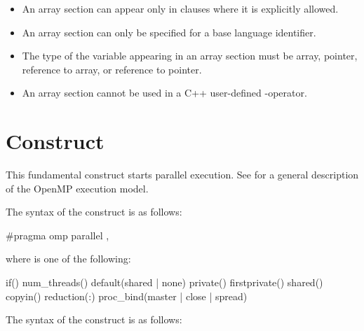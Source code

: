 \begin{itemize}
\item An array section can appear only in clauses where it is explicitly allowed.

\ccppspecificstart
\item An array section can only be specified for a base language identifier. 

\item The type of the variable appearing in an array section must be array, pointer, 
reference to array, or reference to pointer.
\ccppspecificend

\cppspecificstart
\item An array section cannot be used in a C++ user-defined \code{[]}-operator.
\cppspecificend
\end{itemize}











\section{ Construct}
\label{sec:parallel Construct}
\summary
This fundamental construct starts parallel execution. See 
for a general description of the OpenMP execution model.

\syntax
\ccppspecificstart
The syntax of the  construct is as follows:
\begin{boxedcode}
\#pragma omp parallel \plc{[clause[ [},\plc{] clause] ... ] new-line}
\end{boxedcode}

where  is one of the following:

\begin{indentedcodelist}
if()
num\_threads()
default(shared \textnormal{|} none)
private()
firstprivate()
shared()
copyin()
reduction(:)
proc\_bind(master \textnormal{|} close \textnormal{|} spread)
\end{indentedcodelist}
\ccppspecificend

\fortranspecificstart
The syntax of the  construct is as follows:

